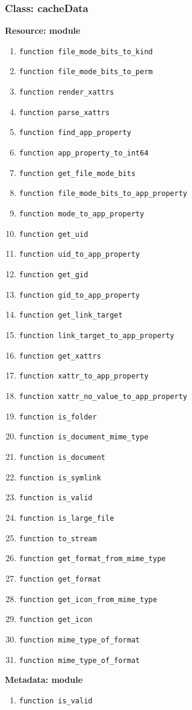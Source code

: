 \subsubsection{Class: cacheData}
\textbf{Resource: module}
\begin{enumerate}
    \item \verb|function file_mode_bits_to_kind| 
    \item \verb|function file_mode_bits_to_perm| 
    \item \verb|function render_xattrs| 
    \item \verb|function parse_xattrs| 
    \item \verb|function find_app_property| 
    \item \verb|function app_property_to_int64| 
    \item \verb|function get_file_mode_bits| 
    \item \verb|function file_mode_bits_to_app_property| 
    \item \verb|function mode_to_app_property| 
    \item \verb|function get_uid| 
    \item \verb|function uid_to_app_property| 
    \item \verb|function get_gid| 
    \item \verb|function gid_to_app_property| 
    \item \verb|function get_link_target| 
    \item \verb|function link_target_to_app_property| 
    \item \verb|function get_xattrs| 
    \item \verb|function xattr_to_app_property| 
    \item \verb|function xattr_no_value_to_app_property| 
    \item \verb|function is_folder| 
    \item \verb|function is_document_mime_type| 
    \item \verb|function is_document| 
    \item \verb|function is_symlink| 
    \item \verb|function is_valid| 
    \item \verb|function is_large_file| 
    \item \verb|function to_stream| 
    \item \verb|function get_format_from_mime_type| 
    \item \verb|function get_format| 
    \item \verb|function get_icon_from_mime_type| 
    \item \verb|function get_icon| 
    \item \verb|function mime_type_of_format| 
    \item \verb|function mime_type_of_format| 
\end{enumerate}
\textbf{Metadata: module}
\begin{enumerate}
    \item \verb|function is_valid| 
\end{enumerate}
